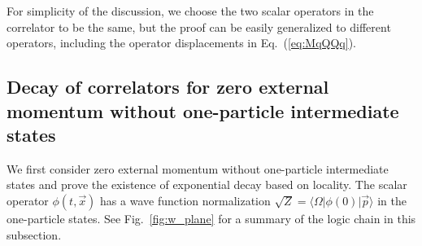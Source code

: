 \documentclass[a4paper,11pt]{article}
\begin{document}
For simplicity of the discussion, we choose the two scalar operators in the correlator to be the same, but the proof can be easily generalized to different operators, including the operator displacements in Eq.~(\ref{eq:MqQQq}). 
 

 
\subsection{Decay of correlators for zero external momentum without one-particle intermediate states}\label{sec:decayzerowoone}
We first consider zero external momentum without one-particle intermediate states and prove the existence of exponential decay based on locality. The scalar operator $\phi(t,\vec{x})$ has a wave function normalization $ \sqrt{Z}=\langle \Omega|\phi(0)|\vec{p}\rangle$ in the one-particle states. See Fig.~\ref{fig:w_plane} for a summary of the logic chain in this subsection. 
\end{document}
